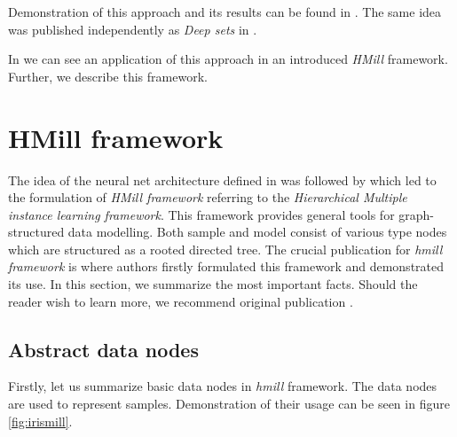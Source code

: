Demonstration of this approach and its results can be found in \cite{Pevny2016a,Pevny2017, PevnyDedic2020, Mandlik2020, Janisch2020,PevnyKovarik2019a}. The same idea was published independently as \emph{Deep sets} in \cite{Zaheer2018}.

In \cite{Mandlik2020} we can see an application of this approach in an introduced \emph{HMill} framework. Further, we describe this framework.







\section{HMill framework}
The idea of the neural net architecture defined in \cite{Pevny2016a} was followed by \cite{Mandlik2020} which led to the formulation of \emph{HMill framework} referring to the \emph{Hierarchical Multiple instance learning framework}. This framework provides general tools for graph-structured data modelling. Both sample and model consist of various type nodes which are structured as a rooted directed tree. The crucial publication for \emph{hmill framework} is \cite{Mandlik2020} where authors firstly formulated this framework and demonstrated its use. In this section, we summarize the most important facts. Should the reader wish to learn more, we recommend original publication \cite{Mandlik2020}.

\subsection{Abstract data nodes}
Firstly, let us summarize basic data nodes in \emph{hmill} framework. The data nodes are used to represent samples. Demonstration of their usage can be seen in figure \ref{fig:irismill}.
